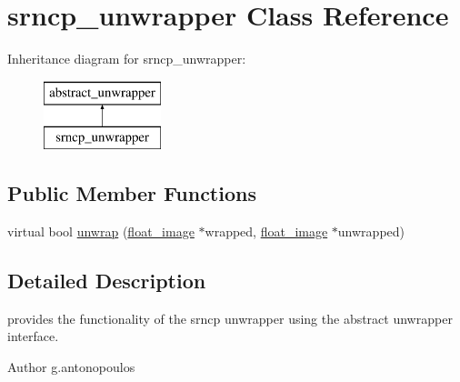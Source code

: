 \hypertarget{classsrncp__unwrapper}{\section{srncp\-\_\-unwrapper Class Reference}
\label{classsrncp__unwrapper}
}
Inheritance diagram for srncp\-\_\-unwrapper\-:\begin{figure}[H]
\begin{center}
\leavevmode
\includegraphics[height=2.000000cm]{classsrncp__unwrapper}
\end{center}
\end{figure}
\subsection*{Public Member Functions}
\begin{DoxyCompactItemize}
\item 
virtual bool \hyperlink{classsrncp__unwrapper_a9ca1b579f9ad3595daad40a7d9391376}{unwrap} (\hyperlink{classfloat__image}{float\-\_\-image} $\ast$wrapped, \hyperlink{classfloat__image}{float\-\_\-image} $\ast$unwrapped)
\end{DoxyCompactItemize}


\subsection{Detailed Description}
provides the functionality of the srncp unwrapper using the abstract unwrapper interface. \begin{DoxyAuthor}{Author}
g.\-antonopoulos 
\end{DoxyAuthor}


